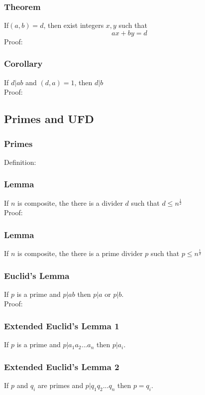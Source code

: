 \documentclass{article}
\begin{document}
\subsubsection{Theorem}
If$(a,b)=d$, then exist integers $x, y$ such that
$$ax+by=d$$
Proof:
\vspace{60px}

\subsubsection{Corollary}
If $d|ab$ and $(d,a)=1$, then $d|b$\\
Proof:
\vspace{40px}

\subsection{Primes and UFD}
\subsubsection{Primes}
Definition:
\vspace{20px}
\subsubsection{Lemma}
If $n$ is composite, the there is a divider $d$ such that $d \le n^{\frac{1}{2}}$\\
Proof:
\vspace{20px}
\subsubsection{Lemma}
If $n$ is composite, the there is a prime divider $p$ such that $p \le n^{\frac{1}{2}}$
\subsubsection{Euclid's Lemma}
If $p$ is a prime and $p|ab$ then $p|a$ or $p|b$.\\
Proof:

\pagebreak
\subsubsection{Extended Euclid's Lemma 1}
If $p$ is a prime and $p|a_1 a_2 ... a_n $ then $p|a_i$.

\subsubsection{Extended Euclid's Lemma 2}
If $p$ and $q_i$ are primes and $p|q_1 q_2 ... q_n $ then $p=q_i$.
\end{document}
